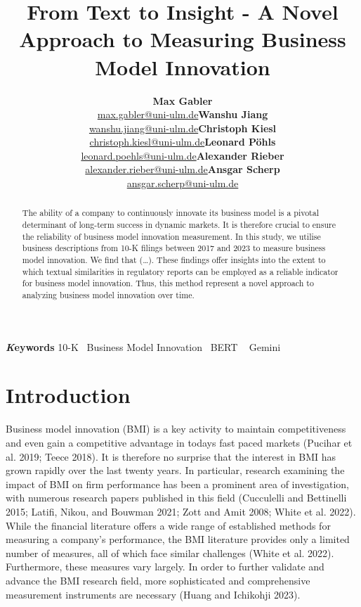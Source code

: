 \documentclass[
]{article}
\title{From Text to Insight - A Novel Approach to Measuring Business
Model Innovation}
\author{\textbf{Max
Gabler}\\\href{mailto:max.gabler@uni-ulm.de}{max.gabler@uni-ulm.de}\asep\textbf{Wanshu
Jiang}\\\href{mailto:wanshu.jiang@uni-ulm.de}{wanshu.jiang@uni-ulm.de}\asep\textbf{Christoph
Kiesl}\\\href{mailto:christoph.kiesl@uni-ulm.de}{christoph.kiesl@uni-ulm.de}\asep\textbf{Leonard
Pöhls}\\\href{mailto:leonard.poehls@uni-ulm.de}{leonard.poehls@uni-ulm.de}\asep\textbf{Alexander
Rieber}\\\href{mailto:alexander.rieber@uni-ulm.de}{alexander.rieber@uni-ulm.de}\asep\textbf{Ansgar
Scherp}\\\href{mailto:ansgar.scherp@uni-ulm.de}{ansgar.scherp@uni-ulm.de}}
\date{}
\begin{document}
\maketitle
\begin{abstract}
The ability of a company to continuously innovate its business model is
a pivotal determinant of long-term success in dynamic markets. It is
therefore crucial to ensure the reliability of business model innovation
measurement. In this study, we utilise business descriptions from 10-K
filings between 2017 and 2023 to measure business model innovation. We
find that (\ldots). These findings offer insights into the extent to
which textual similarities in regulatory reports can be employed as a
reliable indicator for business model innovation. Thus, this method
represent a novel approach to analyzing business model innovation over
time.
\end{abstract}
{\bfseries \emph Keywords}
\def\sep{\textbullet\ }
10-K \sep Business Model Innovation \sep BERT \sep 
Gemini


\newpage{}

\section{Introduction}\label{introduction}

Business model innovation (BMI) is a key activity to maintain
competitiveness and even gain a competitive advantage in todays fast
paced markets (Pucihar et al. 2019; Teece 2018). It is therefore no
surprise that the interest in BMI has grown rapidly over the last twenty
years. In particular, research examining the impact of BMI on firm
performance has been a prominent area of investigation, with numerous
research papers published in this field (Cucculelli and Bettinelli 2015;
Latifi, Nikou, and Bouwman 2021; Zott and Amit 2008; White et al. 2022).
While the financial literature offers a wide range of established
methods for measuring a company's performance, the BMI literature
provides only a limited number of measures, all of which face similar
challenges (White et al. 2022). Furthermore, these measures vary
largely. In order to further validate and advance the BMI research
field, more sophisticated and comprehensive measurement instruments are
necessary (Huang and Ichikohji 2023).
\end{document}
